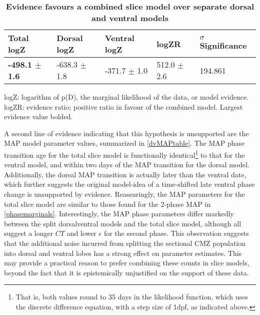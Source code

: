 \begin{table}[!ht]
    \centering
    \caption{{\bf Evidence favours a combined slice model over separate dorsal and ventral models}}
    \begin{tabular}{|l|l|l|l|l|}
        \hline
        {\bf Total logZ} & {\bf Dorsal logZ} & {\bf Ventral logZ} & {\bf logZR} & {\bf $\sigma$ Significance}\\ \hline
        {\bf -498.1 $\pm$ 1.6} & -638.3 $\pm$ 1.8 & -371.7 $\pm$ 1.0 & 512.0 $\pm$ 2.6 & 194.861\\ \hline
        \end{tabular}
    \begin{flushleft} logZ: logarithm of p(D), the marginal likelihood of the data, or model evidence. logZR: evidence ratio; positive ratio in favour of the combined model. Largest evidence value bolded.
    \end{flushleft}
    \label{dvtable}
\end{table}

A second line of evidence indicating that this hypothesis is unsupported are the MAP model parameter values, summarized in \autoref{dvMAPtable}. The MAP phase transition age for the total slice model is functionally identical\footnote{That is, both values round to 35 days in the likelihood function, which uses the discrete difference equation, with a step size of 1dpf, as indicated above.} to that for the ventral model, and within two days of the MAP transition for the dorsal model. Additionally, the dorsal MAP transition is actually later than the ventral date, which further suggests the original model-idea of a time-shifted late ventral phase change is unsupported by evidence. Reassuringly, the MAP parameters for the total slice model are similar to those found for the 2-phase MAP in \autoref{phasemarginals}. Interestingly, the MAP phase parameters differ markedly between the split dorsal\/ventral models and the total slice model, although all suggest a longer $CT$ and lower $\epsilon$ for the second phase. This observation suggests that the additional noise incurred from splitting the sectional CMZ population into dorsal and ventral lobes has a strong effect on parameter estimates. This may provide a practical reason to prefer combining these counts in slice models, beyond the fact that it is epistemically unjustified on the support of these data. 

